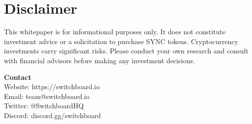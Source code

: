 \documentclass[12pt,a4paper]{article}
\begin{document}
\section{Disclaimer}

This whitepaper is for informational purposes only. It does not constitute investment advice or a solicitation to purchase SYNC tokens. Cryptocurrency investments carry significant risks. Please conduct your own research and consult with financial advisors before making any investment decisions.

\vspace{1cm}
\begin{center}
\textbf{Contact}\\
Website: https://switchboard.io\\
Email: team@switchboard.io\\
Twitter: @SwitchboardHQ\\
Discord: discord.gg/switchboard
\end{center}
\end{document}
